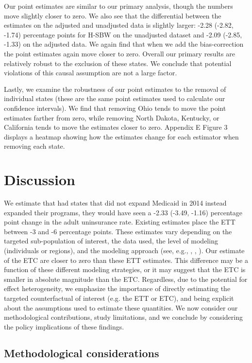 \documentclass[aoas]{imsart}
\theoremstyle{plain}
\theoremstyle{remark}
\begin{document}
Our point estimates are similar to our primary analysis, though the numbers move slightly closer to zero. We also see that the differential between the estimates on the adjusted and unadjusted data is slightly larger: -2.28 (-2.82, -1.74) percentage points for H-SBW on the unadjusted dataset and -2.09 (-2.85, -1.33) on the adjusted data. We again find that when we add the bias-correction the point estimates again move closer to zero. Overall our primary results are relatively robust to the exclusion of these states. We conclude that potential violations of this causal assumption are not a large factor.

Lastly, we examine the robustness of our point estimates to the removal of individual states (these are the same point estimates used to calculate our confidence intervals). We find that removing Ohio tends to move the point estimates farther from zero, while removing North Dakota, Kentucky, or California tends to move the estimates closer to zero. Appendix E Figure 3 displays a heatmap showing how the estimates change for each estimator when removing each state.

\section{Discussion}

We estimate that had states that did not expand Medicaid in 2014 instead expanded their programs, they would have seen a -2.33 (-3.49, -1.16) percentage point change in the adult uninsurance rate. Existing estimates place the ETT between -3 and -6 percentage points. These estimates vary depending on the targeted sub-population of interest, the data used, the level of modeling (individuals or regions), and the modeling approach (see, e.g., \cite{courtemanche2017early}, \cite{kaestner2017effects}, \cite{frean2017premium}). Our estimate of the ETC are closer to zero than these ETT estimates. This difference may be a function of these different modeling strategies, or it may suggest that the ETC is smaller in absolute magnitude than the ETC. Regardless, due to the potential for effect heterogeneity, we emphasize the importance of directly estimating the targeted counterfactual of interest (e.g. the ETT or ETC), and being explicit about the assumptions used to estimate these quantities. We now consider our methodological contributions, study limitations, and we conclude by considering the policy implications of these findings.

\subsection{Methodological considerations}
\end{document}
